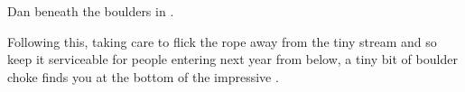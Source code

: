 \begin{marginfigure}
\checkoddpage \ifoddpage \forcerectofloat \else \forceversofloat \fi
\centering
 \caption{Dan beneath the boulders in \protect{}. }
 \label{Hanging Garden}
\end{marginfigure}

Following this, taking care to flick the rope away from the tiny stream
and so keep it serviceable for people entering next year from below, a
tiny bit of boulder choke finds you at the bottom of the impressive
.


